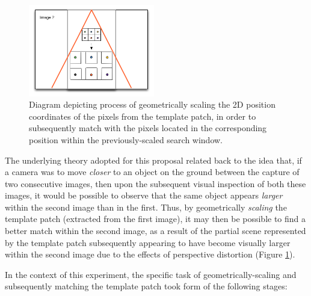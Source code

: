 \begin{figure}
  \begin{center}
    \includegraphics[width=0.49\textwidth]{images/scaling.png}
  \end{center}
  \vspace{-10pt}
  \caption{Diagram depicting process of geometrically scaling the 2D position coordinates of the pixels from the template patch, in order to subsequently match with the pixels located in the corresponding position within the previously-scaled search window.}
  \label{fig:scaled}
  \vspace{-10pt}
\end{figure}

The underlying theory adopted for this proposal related back to the idea that, if a camera was to move \textit{closer} to an object on the ground between the capture of two consecutive images, then upon the subsequent visual inspection of both these images, it would be possible to observe that the same object appears \textit{larger} within the second image than in the first. Thus, by geometrically \textit{scaling} the template patch (extracted from the first image), it may then be possible to find a better match within the second image, as a result of the partial scene represented by the template patch subsequently appearing to have become visually larger within the second image due to the effects of perspective distortion (Figure \ref{fig:scaled}).

In the context of this experiment, the specific task of geometrically-scaling and subsequently matching the template patch took form of the following stages:

